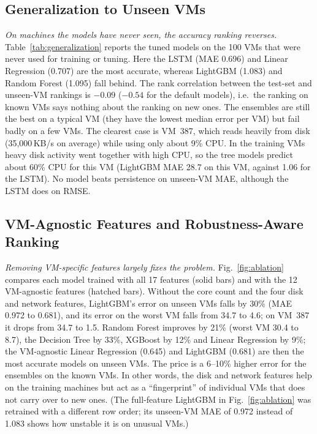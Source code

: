 \documentclass[conference,letterpaper,10pt]{IEEEtran}
\begin{document}
\subsection{Generalization to Unseen VMs}
\textit{On machines the models have never seen, the accuracy ranking reverses.} Table~\ref{tab:generalization} reports the tuned models on the 100 VMs that were never used for training or tuning. Here the LSTM (MAE 0.696) and Linear Regression (0.707) are the most accurate, whereas LightGBM (1.083) and Random Forest (1.095) fall behind. The rank correlation between the test-set and unseen-VM rankings is $-0.09$ ($-0.54$ for the default models), i.e.\ the ranking on known VMs says nothing about the ranking on new ones. The ensembles are still the best on a typical VM (they have the lowest median error per VM) but fail badly on a few VMs. The clearest case is VM~387, which reads heavily from disk (35{,}000\,KB/s on average) while using only about 9\% CPU. In the training VMs heavy disk activity went together with high CPU, so the tree models predict about 60\% CPU for this VM (LightGBM MAE 28.7 on this VM, against 1.06 for the LSTM). No model beats persistence on unseen-VM MAE, although the LSTM does on RMSE.



\subsection{VM-Agnostic Features and Robustness-Aware Ranking}
\textit{Removing VM-specific features largely fixes the problem.} Fig.~\ref{fig:ablation} compares each model trained with all 17 features (solid bars) and with the 12 VM-agnostic features (hatched bars). Without the core count and the four disk and network features, LightGBM's error on unseen VMs falls by 30\% (MAE 0.972 to 0.681), and its error on the worst VM falls from 34.7 to 4.6; on VM~387 it drops from 34.7 to 1.5. Random Forest improves by 21\% (worst VM 30.4 to 8.7), the Decision Tree by 33\%, XGBoost by 12\% and Linear Regression by 9\%; the VM-agnostic Linear Regression (0.645) and LightGBM (0.681) are then the most accurate models on unseen VMs. The price is a 6--10\% higher error for the ensembles on the known VMs. In other words, the disk and network features help on the training machines but act as a ``fingerprint'' of individual VMs that does not carry over to new ones. (The full-feature LightGBM in Fig.~\ref{fig:ablation} was retrained with a different row order; its unseen-VM MAE of 0.972 instead of 1.083 shows how unstable it is on unusual VMs.)
\end{document}
